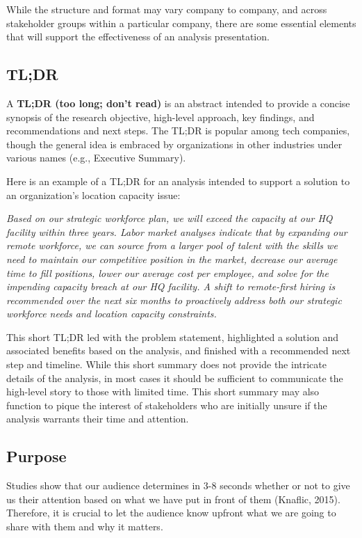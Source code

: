 \documentclass[
]{book}
\begin{document}
While the structure and format may vary company to company, and across stakeholder groups within a particular company, there are some essential elements that will support the effectiveness of an analysis presentation.

\hypertarget{tldr}{%
\subsection{TL;DR}\label{tldr}}

A \textbf{TL;DR (too long; don't read)} is an abstract intended to provide a concise synopsis of the research objective, high-level approach, key findings, and recommendations and next steps. The TL;DR is popular among tech companies, though the general idea is embraced by organizations in other industries under various names (e.g., Executive Summary).

Here is an example of a TL;DR for an analysis intended to support a solution to an organization's location capacity issue:

\emph{Based on our strategic workforce plan, we will exceed the capacity at our HQ facility within three years. Labor market analyses indicate that by expanding our remote workforce, we can source from a larger pool of talent with the skills we need to maintain our competitive position in the market, decrease our average time to fill positions, lower our average cost per employee, and solve for the impending capacity breach at our HQ facility. A shift to remote-first hiring is recommended over the next six months to proactively address both our strategic workforce needs and location capacity constraints.}

This short TL;DR led with the problem statement, highlighted a solution and associated benefits based on the analysis, and finished with a recommended next step and timeline. While this short summary does not provide the intricate details of the analysis, in most cases it should be sufficient to communicate the high-level story to those with limited time. This short summary may also function to pique the interest of stakeholders who are initially unsure if the analysis warrants their time and attention.

\hypertarget{purpose}{%
\subsection{Purpose}\label{purpose}}

Studies show that our audience determines in 3-8 seconds whether or not to give us their attention based on what we have put in front of them (Knaflic, 2015). Therefore, it is crucial to let the audience know upfront what we are going to share with them and why it matters.
\end{document}

